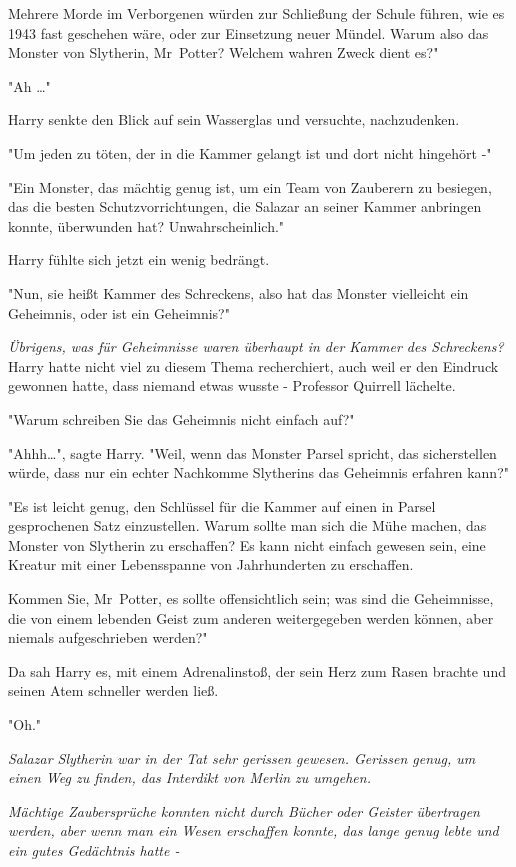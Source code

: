 {Mehrere Morde im Verborgenen würden zur Schließung der Schule führen, wie es 1943 fast geschehen wäre, oder zur Einsetzung neuer Mündel. Warum also das Monster von Slytherin, Mr~Potter? Welchem wahren Zweck dient es?"

"Ah …"

Harry senkte den Blick auf sein Wasserglas und versuchte, nachzudenken.

"Um jeden zu töten, der in die Kammer gelangt ist und dort nicht hingehört -"

"Ein Monster, das mächtig genug ist, um ein Team von Zauberern zu besiegen, das die besten Schutzvorrichtungen, die Salazar an seiner Kammer anbringen konnte, überwunden hat? Unwahrscheinlich."

Harry fühlte sich jetzt ein wenig bedrängt.

"Nun, sie heißt Kammer des Schreckens, also hat das Monster vielleicht ein Geheimnis, oder ist ein Geheimnis?"

\emph{Übrigens, was für Geheimnisse waren überhaupt in der Kammer des Schreckens?} Harry hatte nicht viel zu diesem Thema recherchiert, auch weil er den Eindruck gewonnen hatte, dass niemand etwas wusste - Professor Quirrell lächelte.

"Warum schreiben Sie das Geheimnis nicht einfach auf?"

"Ahhh…", sagte Harry. "Weil, wenn das Monster Parsel spricht, das sicherstellen würde, dass nur ein echter Nachkomme Slytherins das Geheimnis erfahren kann?"

"Es ist leicht genug, den Schlüssel für die Kammer auf einen in Parsel gesprochenen Satz einzustellen. Warum sollte man sich die Mühe machen, das Monster von Slytherin zu erschaffen? Es kann nicht einfach gewesen sein, eine Kreatur mit einer Lebensspanne von Jahrhunderten zu erschaffen.

Kommen Sie, Mr~Potter, es sollte offensichtlich sein; was sind die Geheimnisse, die von einem lebenden Geist zum anderen weitergegeben werden können, aber niemals aufgeschrieben werden?"

Da sah Harry es, mit einem Adrenalinstoß, der sein Herz zum Rasen brachte und seinen Atem schneller werden ließ.

"Oh."

\emph{Salazar Slytherin war in der Tat sehr gerissen gewesen. Gerissen genug, um einen Weg zu finden, das Interdikt von Merlin zu umgehen.}

\emph{Mächtige Zaubersprüche konnten nicht durch Bücher oder Geister übertragen werden, aber wenn man ein Wesen erschaffen konnte, das lange genug lebte und ein gutes Gedächtnis hatte -}

}
